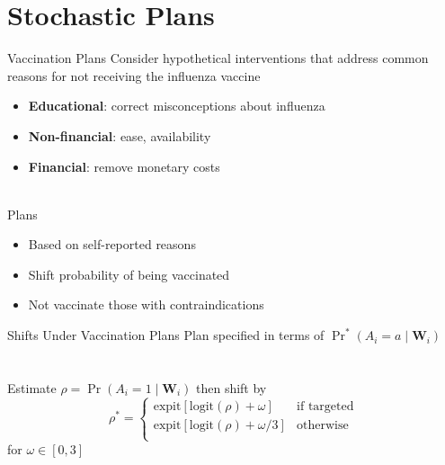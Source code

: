 \documentclass{beamer}
\begin{document}
\section{Stochastic Plans}

\begin{frame}{Vaccination Plans}
	Consider hypothetical interventions that address common reasons for not receiving the influenza vaccine
	\begin{itemize}
		\item \textbf{Educational}: correct misconceptions about influenza
		\item \textbf{Non-financial}: ease, availability
		\item \textbf{Financial}: remove monetary costs
	\end{itemize}
	~\\
	Plans
	\begin{itemize}
		\item Based on self-reported reasons
		\item Shift probability of being vaccinated
		\item Not vaccinate those with contraindications
	\end{itemize}
\end{frame}

\begin{frame}{Shifts Under Vaccination Plans}
	Plan specified in terms of ${\Pr}^*(A_i = a \mid \mathbf{W}_i)$ 
	~\\~\\~\\
	Estimate $\rho = \Pr(A_i = 1 \mid \mathbf{W}_i)$ then shift by
	\begin{equation*}
		\rho^* =
		\begin{cases}
			\text{expit}\left[ \text{logit}(\rho) + \omega \right] & \text{if targeted} \\
			\text{expit}\left[ \text{logit}(\rho) + \omega / 3 \right] & \text{otherwise} \\			
		\end{cases}
	\end{equation*}
	for $\omega \in [0, 3]$
\end{frame}
\end{document}
